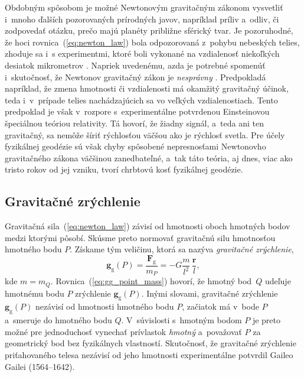 \documentclass[a4paper, 12pt]{book}
\newcommand{\gidx}{\mathrm g}
\let\vec\mathbf
\begin{document}
Obdobným spôsobom je možné Newtonovým gravitačným zákonom vysvetliť i~mnoho 
ďalších pozorovaných prírodných javov, napríklad príliv a~odliv, či zodpovedať 
otázku, prečo majú planéty približne sférický tvar.  Je pozoruhodné, že hoci 
rovnica~(\ref{eq:newton_law}) bola odpozorovaná z~pohybu nebeských telies, 
zhoduje sa i~s experimentmi, ktoré boli vykonané na vzdialenosť niekoľkých 
desiatok mikrometrov \citep{Lee2020}.  Napriek uvedenému, azda je potrebné 
spomenúť i~skutočnosť, že Newtonov gravitačný zákon je \emph{nesprávny} 
\citep{Feynman}.  Predpokladá napríklad, že zmena hmotnosti či vzdialenosti má 
okamžitý gravitačný účinok, teda i~v~prípade telies nachádzajúcich sa vo 
veľkých vzdialenostiach.  Tento predpoklad je však v~rozpore s~experimentálne 
potvrdenou Einsteinovou špeciálnou teóriou relativity.  Tá hovorí, že žiadny 
signál, a~teda ani ten gravitačný, sa nemôže šíriť rýchlosťou väčšou ako je 
rýchlosť svetla.  Pre účely fyzikálnej geodézie sú však chyby spôsobené 
nepresnosťami Newtonovho gravitačného zákona väčšinou zanedbateľné, a~tak táto 
teória, aj dnes, viac ako tristo rokov od jej vzniku, tvorí chrbtovú kosť 
fyzikálnej geodézie.






\subsection{Gravitačné zrýchlenie}
\label{sec:gg}

Gravitačná sila~(\ref{eq:newton_law}) závisí od hmotnosti oboch hmotných 
bodov medzi ktorými pôsobí.  Skúsme preto normovať gravitačnú silu hmotnosťou 
hmotného bodu $P$.  Získame tým veličinu, ktorá sa nazýva \emph{gravitačné 
zrýchlenie},
%
\begin{equation}
\label{eq:gg_point_mass}
\vec g_\gidx(P) = \frac{\vec F_\gidx}{m_P} = -G \frac{m}{l^2} \, \frac{\vec 
r}{l}{,}
\end{equation}
%
kde $m = m_Q$.  Rovnica~(\ref{eq:gg_point_mass}) hovorí, že hmotný 
bod~$Q$ udeľuje hmotnému bodu $P$ zrýchlenie $\vec g_\gidx(P)$.   Inými 
slovami, gravitačné zrýchlenie $\vec g_\gidx(P)$ nezávisí od hmotnosti hmotného 
bodu $P$, začiatok má v~bode $P$ a~smeruje do hmotného bodu $Q$.  V~súvislosti 
s~hmotným bodom $P$ je preto možné pre jednoduchosť vynechať prívlastok 
\emph{hmotný} a~považovať $P$ za geometrický bod bez fyzikálnych vlastností.  
Skutočnosť, že gravitačné zrýchlenie priťahovaného telesa nezávisí od jeho 
hmotnosti experimentálne potvrdil Gaileo Gailei (1564--1642).
\end{document}
